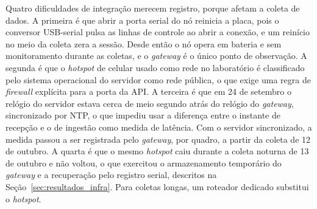 Quatro dificuldades de integração merecem registro, porque afetam a coleta de dados. A primeira é que abrir a porta serial do nó reinicia a placa, pois o conversor USB-serial pulsa as linhas de controle ao abrir a conexão, e um reinício no meio da coleta zera a sessão. Desde então o nó opera em bateria e sem monitoramento durante as coletas, e o \textit{gateway} é o único ponto de observação. A segunda é que o \textit{hotspot} de celular usado como rede no laboratório é classificado pelo sistema operacional do servidor como rede pública, o que exige uma regra de \textit{firewall} explícita para a porta da API. A terceira é que em 24 de setembro o relógio do servidor estava cerca de meio segundo atrás do relógio do \textit{gateway}, sincronizado por NTP, o que impediu usar a diferença entre o instante de recepção e o de ingestão como medida de latência. Com o servidor sincronizado, a medida passou a ser registrada pelo \textit{gateway}, por quadro, a partir da coleta de 12 de outubro. A quarta é que o mesmo \textit{hotspot} caiu durante a coleta noturna de 13 de outubro e não voltou, o que exercitou o armazenamento temporário do \textit{gateway} e a recuperação pelo registro serial, descritos na Seção~\ref{sec:resultados_infra}. Para coletas longas, um roteador dedicado substitui o \textit{hotspot}.


